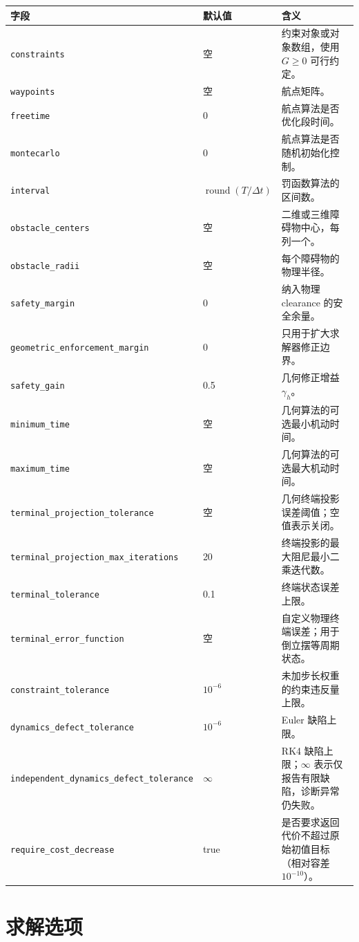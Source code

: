 \documentclass[UTF8,zihao=-4,openany,fontset=fandol]{ctexbook}
\newcommand{\code}[1]{\nolinkurl{#1}}
\begin{document}
\begin{longtable}{p{}p{}p{}}
\toprule
字段 & 默认值 & 含义\\
\midrule
\endhead
\code{constraints} & 空 & 约束对象或对象数组，使用 $G\ge0$ 可行约定。\\
\code{waypoints} & 空 & 航点矩阵。\\
\code{freetime} & 0 & 航点算法是否优化段时间。\\
\code{montecarlo} & 0 & 航点算法是否随机初始化控制。\\
\code{interval} & $\operatorname{round}(T/\Delta t)$ & 罚函数算法的区间数。\\
\code{obstacle_centers} & 空 & 二维或三维障碍物中心，每列一个。\\
\code{obstacle_radii} & 空 & 每个障碍物的物理半径。\\
\code{safety_margin} & 0 & 纳入物理 clearance 的安全余量。\\
\code{geometric_enforcement_margin} & 0 & 只用于扩大求解器修正边界。\\
\code{safety_gain} & 0.5 & 几何修正增益 $\gamma_h$。\\
\code{minimum_time} & 空 & 几何算法的可选最小机动时间。\\
\code{maximum_time} & 空 & 几何算法的可选最大机动时间。\\
\code{terminal_projection_tolerance} & 空 & 几何终端投影误差阈值；空值表示关闭。\\
\code{terminal_projection_max_iterations} & 20 & 终端投影的最大阻尼最小二乘迭代数。\\
\code{terminal_tolerance} & 0.1 & 终端状态误差上限。\\
\code{terminal_error_function} & 空 & 自定义物理终端误差；用于倒立摆等周期状态。\\
\code{constraint_tolerance} & $10^{-6}$ & 未加步长权重的约束违反量上限。\\
\code{dynamics_defect_tolerance} & $10^{-6}$ & Euler 缺陷上限。\\
\code{independent_dynamics_defect_tolerance} & $\infty$ & RK4 缺陷上限；$\infty$ 表示仅报告有限缺陷，诊断异常仍失败。\\
\code{require_cost_decrease} & true & 是否要求返回代价不超过原始初值目标（相对容差 $10^{-10}$）。\\
\bottomrule
\end{longtable}

\section{求解选项}
\end{document}

